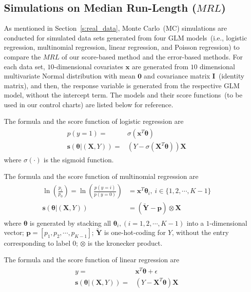 \documentclass[twoside,11pt]{article}
\begin{document}
\begin{appendices}

\section{Simulations on Median Run-Length ($MRL$)}
\label{app:simu_MRL}
As mentioned in Section~\ref{s:real_data}, Monte Carlo~(MC) simulations are conducted for simulated data sets generated from four GLM models~(i.e., logistic regression, multinomial regression, linear regression, and Poisson regression) to compare the $MRL$ of our score-based method and the error-based methods. For each data set, $10$-dimensional covariates $\bm{x}$ are generated from $10$ dimensional multivariate Normal distribution with mean $\bm{0}$ and covariance matrix $\mathbf {I}$~(identity matrix), and then, the response variable is generated from the respective GLM model, without the intercept term. The models and their score functions~(to be used in our control charts) are listed below for reference.

\noindent
The formula and the score function of logistic regression are
\begin{align}
\begin{aligned}
p(y=1) =& \sigma ( \bm {x}^T\bm { \theta}) \\
\bm{s}(\bm { \theta}|(\bm {X}, Y)) =&  (Y- \sigma (\bm {X}^T\bm { \theta} )) \bm {X}
\end{aligned}
\label{eqn:logis_score}
\end{align}
where $ \sigma ( \cdot)$ is the sigmoid function.

\noindent
The formula and the score function of multinomial regression are
\begin{align}
\begin{aligned}
\ln (\frac{p_i}{p_0}) = \ln (\frac{p(y=i)}{p(y=0)})&=\bm {x}^{T} \bm { \theta}_i, ~ i \in \{1,2,\cdots,K-1\} \\
\bm {s}(\bm { \theta} | (\bm {X}, Y)) &= (\tilde{\bm{Y}}-\bm {p})\otimes \bm {X}
\end{aligned}
\label{eqn:multi_score}
\end{align}
where $\bm { \theta} $ is generated by stacking all $ \bm { \theta}_i , (i=1,2,\cdots,K-1)$ into a $1$-dimensional vector; $\bm {p}=[p_1, p_2, \cdots, p _{K-1}]$; $\tilde{\bm{Y}}$ is one-hot-coding for $Y$, without the entry corresponding to label $0$; $\otimes$ is the kronecker product. 

\noindent
The formula and the score function of linear regression are
\begin{align}
\begin{aligned}
y=& \bm {x}^T\bm { \theta}  + \epsilon \\
\bm{s}(\bm { \theta} |(\bm {X}, Y)) =& (Y - \bm {X}^T\bm { \theta} ) \bm {X}
\end{aligned}
\label{eqn:lin_score}
\end{align}


\end{appendices}
\end{document}
